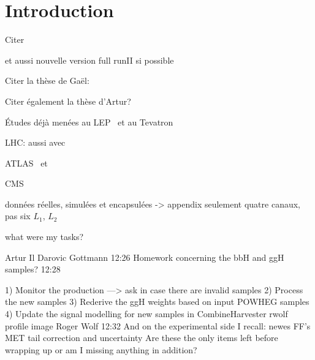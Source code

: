 \section{Introduction}\label{chapter-HTT_analysis-section-introduction}

Citer 

et aussi nouvelle version full runII si possible


Citer la thèse de Gaël:\\

Citer également la thèse d'Artur?\\


Études déjà menées au LEP~\cite{Schael:2006cr} et au Tevatron~\cite{Aaltonen:2009vf,Abazov:2011jh}

LHC: aussi avec \quarkb\antiquarkb~\cite{Chatrchyan:2013qga,Khachatryan:2015tra}

ATLAS \mu\mu\ et \tau\tau~\cite{Aad:2012cfr,ATLAS-MSSM-HTT_2018,ATLAS-MSSM-HTT_2020}

CMS \mu\mu~\cite{CMS:2015ooa} \tau\tau~\cite{Chatrchyan:2012vp,CMS-MSSM-HTT_2014,CMS-PAS-HIG-17-020}


données réelles, simulées et encapsulées  -> appendix
seulement quatre canaux, pas six
$L_1$, $L_2$

what were my tasks?

	
Artur Il Darovic Gottmann
12:26
Homework concerning the bbH and ggH samples?
12:28




1) Monitor the production ---> ask in case there are invalid samples
2) Process the new samples
3) Rederive the ggH weights based on input POWHEG samples
4) Update the signal modelling for new samples in CombineHarvester
rwolf profile image	
Roger Wolf
12:32
And on the experimental side I recall:
newes FF's
MET tail correction and uncertainty
Are these the only items left before wrapping up or am I missing anything in addition?